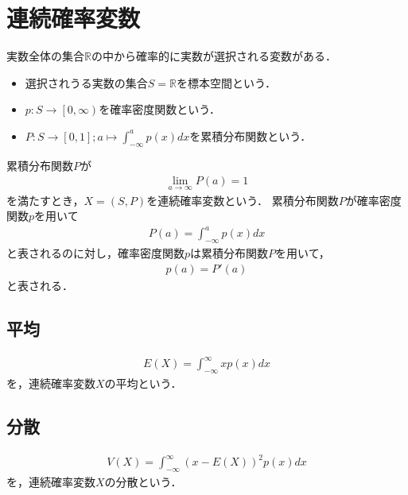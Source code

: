 \documentclass[dvipdfmx]{jsarticle}
\begin{document}
 \section{連続確率変数}
実数全体の集合$\mathbb{R}$の中から確率的に実数が選択される変数がある．
 \begin{itemize}
  \item 選択されうる実数の集合$S=\mathbb{R}$を標本空間という．
  \item $p:S\to\left[0,\infty\right)$を確率密度関数という．
  \item $P:S\to\left[0,1\right];a\mapsto\int_{-\infty}^ap\left(x\right)dx$を累積分布関数という．
 \end{itemize}
累積分布関数$P$が
 \begin{align}
\lim_{a\to\infty}P\left(a\right)=1
 \end{align}
を満たすとき，$X=\left(S,P\right)$を連続確率変数という．
累積分布関数$P$が確率密度関数$p$を用いて
 \begin{align}
P\left(a\right)=\int_{-\infty}^ap\left(x\right)dx
 \end{align}
と表されるのに対し，確率密度関数$p$は累積分布関数$P$を用いて，
 \begin{align}
p\left(a\right)=P'\left(a\right)
 \end{align}
と表される．
 \subsection{平均}
 \begin{align}
E\left(X\right)=\int_{-\infty}^\infty xp\left(x\right)dx
 \end{align}
を，連続確率変数$X$の平均という．
 \subsection{分散}
 \begin{align}
V\left(X\right)=\int_{-\infty}^\infty \left(x-E\left(X\right)\right)^2p\left(x\right)dx
 \end{align}
を，連続確率変数$X$の分散という．
\end{document}
